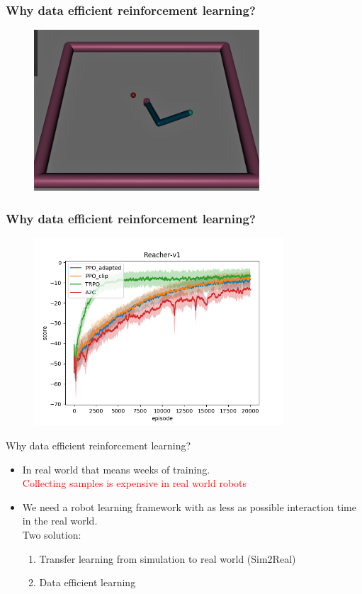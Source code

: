 \documentclass{beamer}
\begin{document}
\begin{frame}
  \frametitle{Why data efficient reinforcement learning?}
  \begin{figure}[h]
      \centering
      \captionsetup{labelformat=empty}
      \includegraphics[height=6cm]{img/Reacher(Mujoco).png}
      \label{fig:my_label}
  \end{figure}
\end{frame}

\begin{frame}
  \frametitle{Why data efficient reinforcement learning?}
  \begin{figure}[h]
      \centering
      \captionsetup{labelformat=empty}
      \includegraphics[height=7cm]{img/Reacher.png}
      \label{fig:my_label}
  \end{figure}
\end{frame}



\begin{frame}{Why data efficient reinforcement learning?}
\begin{itemize}
    \item In real world that means weeks of training.\\
    \textcolor{red}{Collecting samples is expensive in real world robots}
    \item We need a robot learning framework with as less as possible interaction time in the real world.\\
    Two solution:
    \begin{enumerate}
        \item Transfer learning from simulation to real world (Sim2Real)
        \item Data efficient learning
    \end{enumerate}
\end{itemize}
\end{frame}
\end{document}
